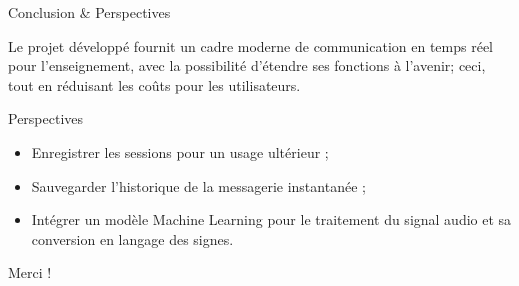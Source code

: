 \documentclass{beamer}
\begin{document}
\begin{frame}{Conclusion \& Perspectives}
  \begin{block}{}
    Le projet développé fournit un cadre moderne de communication 
    en temps réel pour l'enseignement, avec la possibilité d'étendre ses fonctions à l'avenir;
    ceci, tout en réduisant les coûts pour les utilisateurs.
  \end{block}

  \begin{block}{Perspectives}
    \begin{itemize}
      \item Enregistrer les sessions pour un usage ultérieur ;
      \item Sauvegarder l'historique de la messagerie instantanée ;
      \item Intégrer un modèle Machine Learning pour le traitement du signal audio et sa conversion
      en langage des signes.
    \end{itemize}
  \end{block}
\end{frame}

\begin{frame}
  \begin{center}
  \Huge{Merci !}
  \end{center}

\end{frame}
\end{document}
